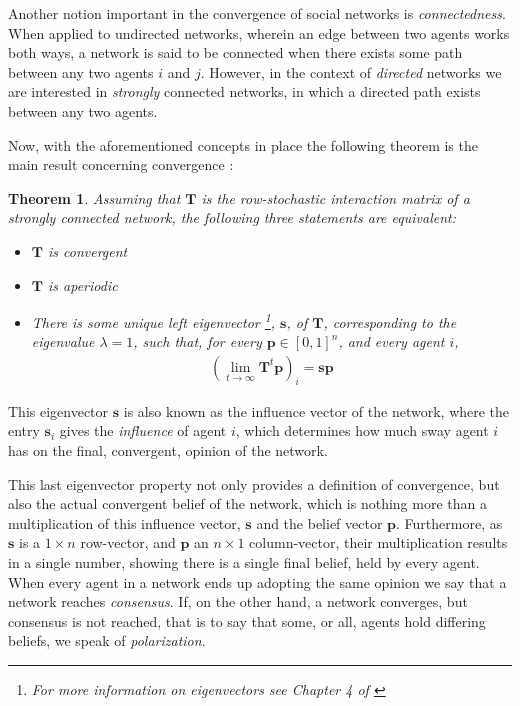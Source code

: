 \documentclass[a4paper, 12pt]{report}
\newtheorem{theorem}{Theorem}
\newcommand{\T}{\bm{T}}
\begin{document}
Another notion important in the convergence of social networks is \emph{connectedness}. When applied to undirected networks, wherein an edge between two agents works both ways, a network is said to be connected when there exists some path between any two agents $i$ and $j$. However, in the context of \emph{directed} networks we are interested in \emph{strongly} connected networks, in which a directed path exists between any two agents.

Now, with the aforementioned concepts in place the following theorem is the main result concerning convergence \parencite{degroot1974concensus}:

\begin{theorem}
\label{convergence:theorem}
\noindent Assuming that $\T$ is the row-stochastic interaction matrix of a strongly connected network, the following three statements are equivalent:
\begin{itemize}
    \item[-] $\T$ is convergent
    \item[-] $\T$ is aperiodic
    \item[-] There is some unique left eigenvector \footnote{For more information on eigenvectors see Chapter 4 of \cite{poole2014linear}}, $\bm{s}$, of $\T$, corresponding to the eigenvalue $\lambda=1$, such that, for every $\bm{p}\in [0,1]^n$, and every agent $i$,
    \begin{align*}
        (\lim_{t\to\infty}\T^t\bm{p})_i = \bm{sp}
    \end{align*}
\end{itemize}
\end{theorem}

This eigenvector $\bm{s}$ is also known as the influence vector of the network, where the entry $\bm{s}_i$ gives the \emph {influence} of agent $i$, which determines how much sway agent $i$ has on the final, convergent, opinion of the network.

This last eigenvector property not only provides a definition of convergence, but also the actual convergent belief of the network, which is nothing more than a multiplication of this influence vector, $\bm{s}$ and the belief vector $\bm{p}$. Furthermore, as $\bm{s}$ is a $1 \times n$ row-vector, and $\bm{p}$ an $n \times 1$ column-vector, their multiplication results in a single number, showing there is a single final belief, held by every agent. When every agent in a network ends up adopting the same opinion we say that a network reaches \emph{consensus}. If, on the other hand, a network converges, but consensus is not reached, that is to say that some, or all, agents hold differing beliefs, we speak of \emph{polarization}.
\end{document}

